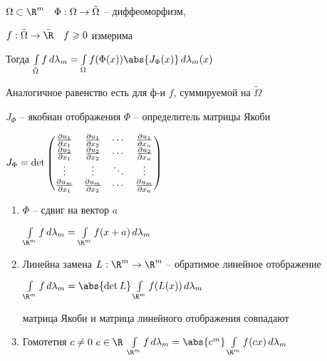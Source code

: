 
\begin{theorem}\thmslashn 
	
	$\Omega \subset \R^m \quad \Phi:\Omega \to \tilde{\Omega}$ -- диффеоморфизм, 
	
	$f:\tilde{\Omega}\to \bar{\R}\quad f \geqslant 0$ измерима
	
	Тогда $\int\limits_{\tilde{\Omega}} f\,d\lambda_m = \int\limits_{\Omega} f(\Phi(x)) \abs{J_\Phi(x)}\,d\lambda_m(x)$
	
	Аналогичное равенство есть для ф-и $f$, суммируемой на $\tilde{\Omega}$

	$J_\Phi$ -- якобиан отображения $\Phi$ -- определитель матрицы Якоби
	
	$J_\Phi = \det\begin{pmatrix}
	{\partial u_1 \over \partial x_1} & {\partial u_1 \over \partial x_2} & \cdots & {\partial u_1 \over \partial x_n} \\
	{\partial u_2 \over \partial x_1} & {\partial u_2 \over \partial x_2} & \cdots & {\partial u_2 \over \partial x_n} \\
	\vdots & \vdots & \ddots &\vdots \\
	{\partial u_m \over \partial x_1} & {\partial u_m \over \partial x_2} & \cdots & {\partial u_m \over \partial x_n}
	\end{pmatrix}$
\end{theorem}


\begin{remark} \thmslashn

\begin{enumerate}
	\item $\Phi$ -- сдвиг на вектор $a$
	
	$\int\limits_{\R^m} f \,d\lambda_m = \int\limits_{\R^m}f(x+a)\,d\lambda_m$
	
	\item Линейна замена $L:\R^m \to \R^m$ -- обратимое линейное отображение
	
	$\int\limits_{\R^m} f \,d\lambda_m = \abs{\det L}\int\limits_{\R^m}f(L(x))\,d\lambda_m$
	
	матрица Якоби и матрица линейного отображения совпадают
	
	
	\item Гомотетия $c \not= 0\,\, c\in \R$
	$\int\limits_{\R^m} f \,d\lambda_m = \abs{c^m}\int\limits_{\R^m}f(cx)\,d\lambda_m$
	
\end{enumerate}

\end{remark}

